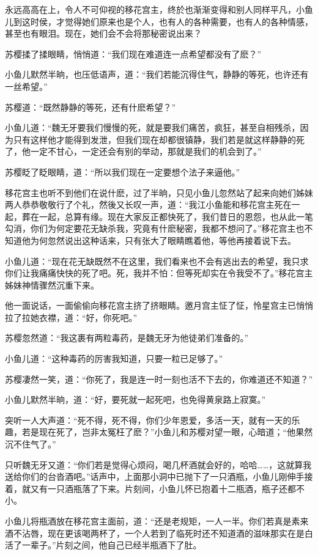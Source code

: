 \documentclass[12pt,oneside]{book}
\begin{document}
永远高高在上，令人不可仰视的移花宫主，终於也渐渐变得和别人同样平凡，小鱼儿到这时侯，才觉得她们原来也是个人，也有人的各种需要，也有人的各种情感，甚至也有眼泪。现在，她们会不会将那秘密说出来？

苏樱揉了揉眼睛，悄悄道：``我们现在难道连一点希望都没有了麽？''

小鱼儿默然半晌，也压低语声，道：``我们若能沉得住气，静静的等死，也许还有一丝希望。''

苏樱道：``既然静静的等死，还有什麽希望？''

小鱼儿道：``魏无牙要我们慢慢的死，就是要我们痛苦，疯狂，甚至自相残杀，因为只有这样他才能得到发泄，但我们现在却都很镇静，我们若是就这样静静的死了，他一定不甘心，一定还会有别的举动，那就是我们的机会到了。''

苏樱眨了眨眼睛，道：``所以我们现在一定要想个法子来逼他。''

移花宫主也听不到他们在说什麽，过了半晌，只见小鱼儿忽然站了起来向她们姊妹两人恭恭敬敬行了个礼，然後又长叹一声，道：``我江小鱼能和移花宫主死在一起，葬在一起，总算有缘。现在大家反正都快死了，我们昔日的恩怨，也从此一笔勾消，你们为何定要花无缺杀我，究竟有什麽秘密，我都不想问了。''移花宫主也不知道他为何忽然说出这种话来，只有张大了眼睛瞧着他，等他再接着说下去。

小鱼儿道：``现在花无缺既然不在这里，我们看来也不会有逃出去的希望，我只求你们让我痛痛快快的死了吧。死，我并不怕：但等死却实在令我受不了。''移花宫主姊妹神情骤然沉重下来。

他一面说话，一面偷偷向移花宫主挤了挤眼睛。邀月宫主怔了怔，怜星宫主已悄悄拉了拉她衣襟，道：``好，你死吧。''

苏樱忽然道：``我这裹有两粒毒药，是魏无牙为他徒弟们准备的。''

小鱼儿道：``这种毒药的厉害我知道，只要一粒已足够了。''

苏樱凄然一笑，道：``你死了，我是连一时一刻也活不下去的，你难道还不知道？''

小鱼儿默然半晌，道：``好，要死就一起死吧，也免得黄泉路上寂寞。''

突听一人大声道：``死不得，死不得，你们少年恩爱，多活一天，就有一天的乐趣，若是现在死了，岂非太冤枉了麽？''小鱼儿和苏樱对望一眼，心暗道；``他果然沉不住气了。''

只听魏无牙又道：``你们若是觉得心烦闷，喝几杯酒就会好的，哈哈\ldots\ldots，这就算我送给你们的台沓酒吧。''话声中，上面那小洞中已抛下了一只酒瓶，小鱼儿刚伸手接着，就又有一只酒瓶落了下来。片刻间，小鱼儿怀已抱着十二瓶酒，瓶子还都不小。

小鱼儿将瓶酒放在移花宫主面前，道：``还是老规矩，一人一半。你们若真是素来酒不沾唇，现在更该喝两杯了，一个人若到了临死时还不知道酒的滋味那实在是白活了一辈子。''片刻之间，他自己已经半瓶酒下了肚。
\end{document}
